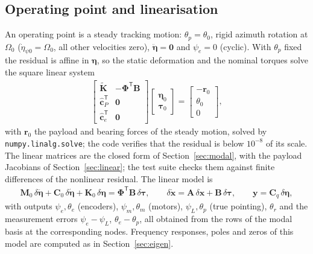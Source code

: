 \documentclass[10pt,a4paper]{article}
\numberwithin{equation}{section}
\begin{document}
\subsection{Operating point and linearisation}
An operating point is a steady tracking motion: $\theta_p = \theta_0$, rigid azimuth rotation at $\Omega_0$ ($\dot\eta_{\psi0} = \Omega_0$, all other velocities zero), $\ddot{\boldsymbol\eta} = \mathbf 0$ and $\psi_e = 0$ (cyclic). With $\theta_p$ fixed the residual is affine in $\boldsymbol\eta$, so the static deformation and the nominal torques solve the square linear system
\begin{gather}
\begin{bmatrix}\tilde{\mathbf K} & -\boldsymbol\Phi^{\mathsf T}\mathbf B\\ \hat{\mathbf c}_P^{\mathsf T} & \mathbf 0\\ \hat{\mathbf c}_e^{\mathsf T} & \mathbf 0\end{bmatrix}\begin{bmatrix}\boldsymbol\eta_0\\ \boldsymbol\tau_0\end{bmatrix} = \begin{bmatrix}-\mathbf r_0\\ \theta_0\\ 0\end{bmatrix},
\end{gather}
with $\mathbf r_0$ the payload and bearing forces of the steady motion, solved by \texttt{numpy.linalg.solve}; the code verifies that the residual is below $10^{-8}$ of its scale. The linear matrices are the closed form of Section~\ref{sec:modal}, with the payload Jacobians of Section~\ref{sec:linear}; the test suite checks them against finite differences of the nonlinear residual. The linear model is
\begin{gather}
\mathbf M_0\,\delta\ddot{\boldsymbol\eta} + \mathbf C_0\,\delta\dot{\boldsymbol\eta} + \mathbf K_0\,\delta\boldsymbol\eta = \boldsymbol\Phi^{\mathsf T}\mathbf B\,\delta\boldsymbol\tau,\qquad \delta\dot{\mathbf x} = \mathbf A\,\delta\mathbf x + \mathbf B\,\delta\boldsymbol\tau,\qquad \mathbf y = \mathbf C_q\,\delta\boldsymbol\eta,
\end{gather}
with outputs $\psi_e, \theta_e$ (encoders), $\psi_m, \theta_m$ (motors), $\psi_L, \theta_p$ (true pointing), $\theta_r$ and the measurement errors $\psi_e - \psi_L$, $\theta_e - \theta_p$, all obtained from the rows of the modal basis at the corresponding nodes. Frequency responses, poles and zeros of this model are computed as in Section~\ref{sec:eigen}.
\end{document}
